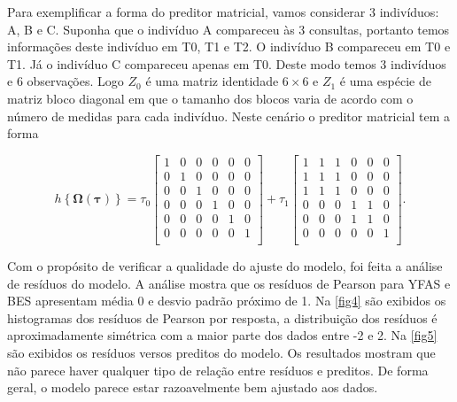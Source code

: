 \documentclass[AMA,STIX1COL]{WileyNJD-v2}
\begin{document}
Para exemplificar a forma do preditor matricial, vamos considerar 3 indivíduos: A, B e C. Suponha que o indivíduo A compareceu às 3 consultas, portanto temos informações deste indivíduo em T0, T1 e T2. O indivíduo B compareceu em T0 e T1. Já o indivíduo C compareceu apenas em T0. Deste modo temos 3 indivíduos e 6 observações. Logo $Z_0$ é uma matriz identidade $6 \times 6$ e $Z_1$ é uma espécie de matriz bloco diagonal em que o tamanho dos blocos varia de acordo com o número de medidas para cada indivíduo. Neste cenário o preditor matricial tem a forma

\begin{equation}
h\left \{ \boldsymbol{\Omega}(\boldsymbol{\tau}) \right \} = 
\tau_0 \begin{bmatrix}
1 & 0 & 0 & 0 & 0 & 0\\ 
0 & 1 & 0 & 0 & 0 & 0\\ 
0 & 0 & 1 & 0 & 0 & 0\\ 
0 & 0 & 0 & 1 & 0 & 0\\ 
0 & 0 & 0 & 0 & 1 & 0\\ 
0 & 0 & 0 & 0 & 0 & 1\\ 
\end{bmatrix} + 
\tau_1 \begin{bmatrix}
1 & 1 & 1 & 0 & 0 & 0\\ 
1 & 1 & 1 & 0 & 0 & 0\\ 
1 & 1 & 1 & 0 & 0 & 0\\ 
0 & 0 & 0 & 1 & 1 & 0\\ 
0 & 0 & 0 & 1 & 1 & 0\\ 
0 & 0 & 0 & 0 & 0 & 1\\ 
\end{bmatrix}.
\end{equation}


Com o propósito de verificar a qualidade do ajuste do modelo, foi feita a análise de resíduos do modelo. A análise mostra que os resíduos de Pearson para YFAS e BES apresentam média 0 e desvio padrão próximo de 1. Na \autoref{fig4} são exibidos os histogramas dos resíduos de Pearson por resposta, a distribuição dos resíduos é aproximadamente simétrica com a maior parte dos dados entre -2 e 2. Na \autoref{fig5} são exibidos os resíduos versos preditos do modelo. Os resultados mostram que não parece haver qualquer tipo de relação entre resíduos e preditos. De forma geral, o modelo parece estar razoavelmente bem ajustado aos dados.
\end{document}
